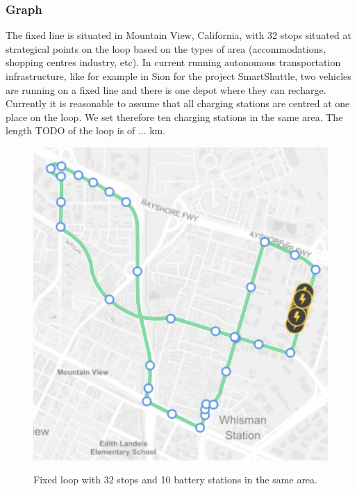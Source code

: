 \documentclass[12pt,a4paper]{article}
\begin{document}
\subsubsection{Graph}
The fixed line is situated in Mountain View, California, with 32 stops situated at strategical points on the loop based on the types of area (accommodations, shopping centres industry, etc). In current running autonomous transportation infrastructure, like for example in Sion for the project SmartShuttle, two vehicles are running on a fixed line and there is one depot where they can recharge. Currently it is reasonable to assume that all charging stations are centred at one place on the loop. We set therefore ten charging stations in the same area. The length TODO of the loop is of ... km.  
\begin{figure}[h] 
  \centering
  \caption{Fixed loop with 32 stops and 10 battery stations in the same area.}
\includegraphics[scale=0.5]{./images/graph}
\label{graph}
\end{figure}
\end{document}
